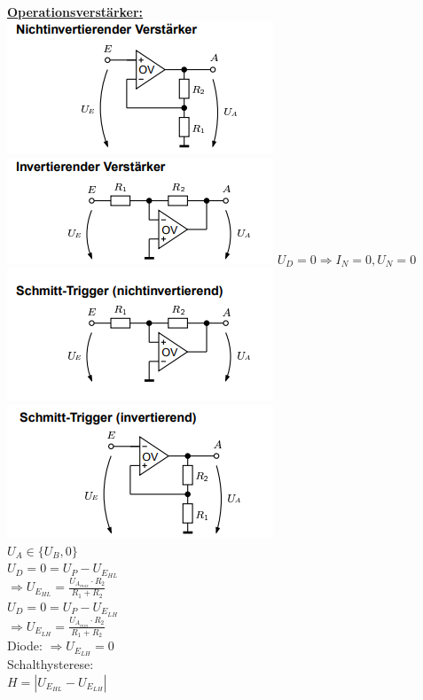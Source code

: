 \documentclass[11pt]{article}
\begin{document}
~~~~~~
\begin{minipage}{0.33\textwidth}
\underline{\textbf{Operationsverstärker:}}\\
\includegraphics[scale=0.40]{NIOV.png}
\includegraphics[scale=0.40]{IOV.png}
$U_D = 0 \Rightarrow I_N = 0, U_N = 0$\\

\includegraphics[scale=0.40]{NISTOV.png}\\
\includegraphics[scale=0.40]{ISTOV.png}\\
$U_A \in \{U_B,0\}$\\
$U_D = 0 = U_P - U_{E_{HL}}$\\
\phantom{sssi}$\Rightarrow U_{E_{HL}} = \frac{U_{A_{max}} \cdot R_2}{R_1 + R_2}$\\
$U_D = 0 = U_P - U_{E_{LH}}$\\
\phantom{sssi}$\Rightarrow U_{E_{LH}}= \frac{ U_{A_{min}} \cdot R_2}{R_1 + R_2}$\\
Diode: $\Rightarrow U_{E_{LH}} = 0$\\
Schalthysterese:\\
\phantom{sssssi} $H = |U_{E_{HL}} - U_{E_{LH}}|$\\


\end{minipage}
\end{document}
